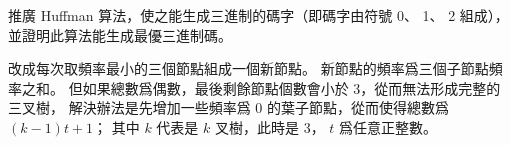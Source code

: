 \startEXERCISE
推廣 Huffman 算法，使之能生成三進制的碼字（即碼字由符號 0、 1、 2 組成），
並證明此算法能生成最優三進制碼。
\stopEXERCISE

\startANSWER
改成每次取頻率最小的三個節點組成一個新節點。
新節點的頻率爲三個子節點頻率之和。
但如果總數爲偶數，最後剩餘節點個數會小於 3，從而無法形成完整的三叉樹，
解決辦法是先增加一些頻率爲 0 的葉子節點，從而使得總數爲 $(k-1)t + 1$；
其中 $k$ 代表是 $k$ 叉樹，此時是 3， $t$ 爲任意正整數。
\stopANSWER
